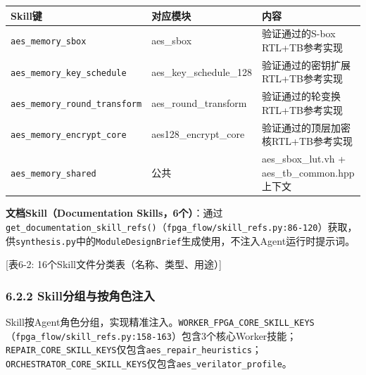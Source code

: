 {\def\LTcaptype{none} %
\begin{longtable}[]{@{}
  >{\raggedright\arraybackslash}p{}
  >{\raggedright\arraybackslash}p{}
  >{\raggedright\arraybackslash}p{}@{}}
\toprule\noalign{}
\begin{minipage}[b]{\linewidth}\raggedright
Skill键
\end{minipage} & \begin{minipage}[b]{\linewidth}\raggedright
对应模块
\end{minipage} & \begin{minipage}[b]{\linewidth}\raggedright
内容
\end{minipage} \\
\midrule\noalign{}
\endhead
\bottomrule\noalign{}
\endlastfoot
\texttt{aes\_memory\_sbox} & aes\_sbox & 验证通过的S-box
RTL+TB参考实现 \\
\texttt{aes\_memory\_key\_schedule} & aes\_key\_schedule\_128 &
验证通过的密钥扩展RTL+TB参考实现 \\
\texttt{aes\_memory\_round\_transform} & aes\_round\_transform &
验证通过的轮变换RTL+TB参考实现 \\
\texttt{aes\_memory\_encrypt\_core} & aes128\_encrypt\_core &
验证通过的顶层加密核RTL+TB参考实现 \\
\texttt{aes\_memory\_shared} & 公共 & aes\_sbox\_lut.vh +
aes\_tb\_common.hpp上下文 \\
\end{longtable}
}

\textbf{文档Skill（Documentation
Skills，6个）}：通过\texttt{get\_documentation\_skill\_refs()}（\texttt{fpga\_flow/skill\_refs.py:86-120}）获取，供\texttt{synthesis.py}中的\texttt{ModuleDesignBrief}生成使用，不注入Agent运行时提示词。

{[}表6-2: 16个Skill文件分类表（名称、类型、用途）{]}

\subsubsection{6.2.2
Skill分组与按角色注入}\label{skillux5206ux7ec4ux4e0eux6309ux89d2ux8272ux6ce8ux5165}

Skill按Agent角色分组，实现精准注入。\texttt{WORKER\_FPGA\_CORE\_SKILL\_KEYS}（\texttt{fpga\_flow/skill\_refs.py:158-163}）包含3个核心Worker技能；\texttt{REPAIR\_CORE\_SKILL\_KEYS}仅包含\texttt{aes\_repair\_heuristics}；\texttt{ORCHESTRATOR\_CORE\_SKILL\_KEYS}仅包含\texttt{aes\_verilator\_profile}。

